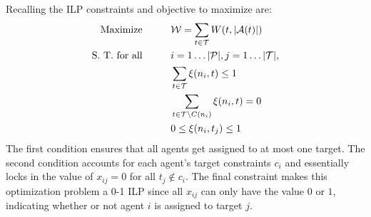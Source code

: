 \documentclass[12pt]{book}
\newcommand{\Pl}{\mathcal{P}} %
\newcommand{\Ta}{\mathcal{T}} %
\newcommand{\We}{\mathcal{W}} %
\begin{document}
Recalling the ILP constraints and objective to maximize are:
\begin{align}
	\text{Maximize}\hspace{1cm} & \We = \sum\limits_{t \in \Ta} W(t, |\mathcal{A}(t)|)\\
	\text{S. T. for all}\hspace{1cm} & i = 1\ldots|\Pl|, j = 1\ldots|\Ta|,\notag\\
	& \sum\limits_{t \in \Ta} \xi(n_i, t) \leq 1\notag\\
	& \sum\limits_{t \in \Ta \backslash C(n_i)} \xi(n_i, t) = 0\notag\\
	& 0 \leq \xi(n_i, t_j) \leq 1\notag	
\end{align}
The first condition ensures that all agents get assigned to at most one target. The second condition accounts for each agent's target constraints $c_i$ and essentially locks in the value of $x_{ij} = 0$ for all $t_j \not\in c_i$. The final constraint makes this optimization problem a 0-1 ILP since all $x_{ij}$ can only have the value $0$ or $1$, indicating whether or not agent $i$ is assigned to target $j$.

\end{document}
